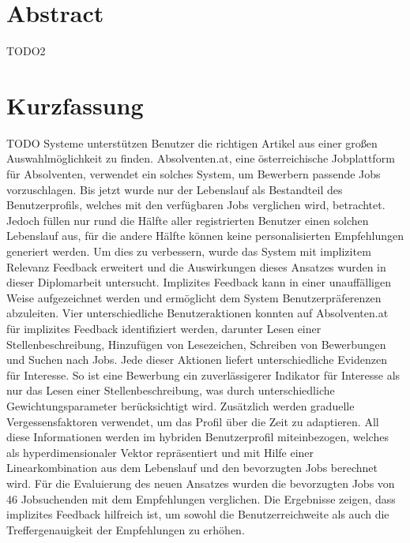 
%
%


\chapter*{Abstract}

TODO2

\newpage

\chapter*{Kurzfassung}


TODO Systeme unterstützen Benutzer die richtigen Artikel aus einer großen Auswahlmöglichkeit zu finden. Absolventen.at, eine österreichische Jobplattform für Absolventen, verwendet ein solches System, um Bewerbern passende Jobs vorzuschlagen. Bis jetzt wurde nur der Lebenslauf als Bestandteil des Benutzerprofils, welches mit den verfügbaren Jobs verglichen wird, betrachtet. Jedoch füllen nur rund die Hälfte aller registrierten Benutzer einen solchen Lebenslauf aus, für die andere Hälfte können keine personalisierten Empfehlungen generiert werden. Um dies zu verbessern, wurde das System mit implizitem Relevanz Feedback erweitert und die Auswirkungen dieses Ansatzes wurden in dieser Diplomarbeit untersucht. Implizites Feedback kann in einer unauffälligen Weise aufgezeichnet werden und ermöglicht dem System Benutzerpräferenzen abzuleiten. Vier unterschiedliche Benutzeraktionen konnten auf Absolventen.at für implizites Feedback identifiziert werden, darunter Lesen einer Stellenbeschreibung, Hinzufügen von Lesezeichen, Schreiben von Bewerbungen und Suchen nach Jobs. Jede dieser Aktionen liefert unterschiedliche Evidenzen für Interesse. So ist eine Bewerbung ein zuverlässigerer Indikator für Interesse als nur das Lesen einer Stellenbeschreibung, was durch unterschiedliche Gewichtungsparameter berücksichtigt wird. Zusätzlich werden graduelle Vergessensfaktoren verwendet, um das Profil über die Zeit zu adaptieren. All diese Informationen werden im hybriden Benutzerprofil miteinbezogen, welches als hyperdimensionaler Vektor repräsentiert und mit Hilfe einer Linearkombination aus dem Lebenslauf und den bevorzugten Jobs berechnet wird.  Für die Evaluierung des neuen Ansatzes wurden die bevorzugten Jobs von 46 Jobsuchenden mit dem Empfehlungen verglichen. Die Ergebnisse zeigen, dass implizites Feedback hilfreich ist, um sowohl die Benutzerreichweite als auch die Treffergenauigkeit der Empfehlungen zu erhöhen.
